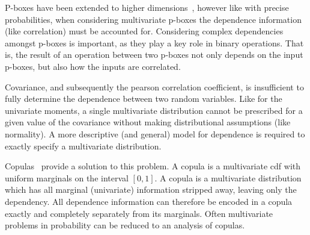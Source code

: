 \documentclass{juliacon}
\begin{document}
P-boxes have been extended to higher dimensions~\cite{montes2015sklar}, however like with precise probabilities, when considering multivariate p-boxes the dependence information (like correlation) must be accounted for. Considering complex dependencies amongst p-boxes is important, as they play a key role in binary operations. That is, the result of an operation between two p-boxes not only depends on the input p-boxes, but also how the inputs are correlated.

Covariance, and subsequently the pearson correlation coefficient, is insufficient to fully determine the dependence between two random variables. Like for the univariate moments, a single multivariate distribution cannot be prescribed for a given value of the covariance without making distributional assumptions (like normality). A more descriptive (and general) model for dependence is required to exactly specify a multivariate distribution.

Copulas~\cite{nelsen2007introduction} provide a solution to this problem. A copula is a multivariate cdf with uniform marginals on the interval $[0, 1]$. A copula is a multivariate distribution which has all marginal (univariate) information stripped away, leaving only the dependency. All dependence information can therefore be encoded in a copula exactly and completely separately from its marginals. Often multivariate problems in probability can be reduced to an analysis of copulas.
\end{document}
